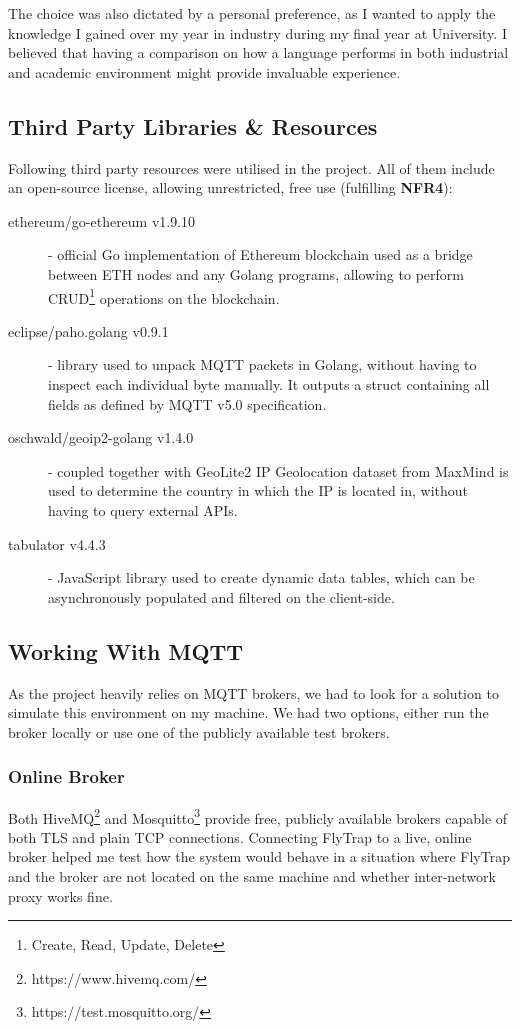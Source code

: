 The choice was also dictated by a personal preference, as I wanted to apply the knowledge I gained over my year in industry during my final year at University. I believed that having a comparison on how a language performs in both industrial and academic environment might provide invaluable experience.
\subsection{Third Party Libraries \& Resources}\label{sec:tpp}
Following third party resources were utilised in the project. All of them include an open-source license, allowing unrestricted, free use (fulfilling \textbf{NFR4}):
\begin{description}
  \item[ethereum/go-ethereum v1.9.10] \cite{ethereum2017official} - official Go implementation of Ethereum blockchain used as a bridge between ETH nodes and any Golang programs, allowing to perform CRUD\footnote{Create, Read, Update, Delete} operations on the blockchain.
    \item[eclipse/paho.golang v0.9.1] \cite{pahogolang} - library used to unpack MQTT packets in Golang, without having to inspect each individual byte manually. It outputs a struct containing all fields as defined by MQTT v5.0 specification.
    \item[oschwald/geoip2-golang v1.4.0] \cite{geoip2} - coupled together with GeoLite2 IP Geolocation dataset from MaxMind \cite{maxmind} is used to determine the country in which the IP is located in, without having to query external APIs. 
    \item[tabulator v4.4.3] \cite{tabulator} - JavaScript library used to create dynamic data tables, which can be asynchronously populated and filtered on the client-side.
\end{description}

\subsection{Working With MQTT}
As the project heavily relies on MQTT brokers, we had to look for a solution to simulate this environment on my machine. We had two options, either run the broker locally or use one of the publicly available test brokers.
\subsubsection{Online Broker}
Both HiveMQ\footnote{https://www.hivemq.com/} and Mosquitto\footnote{https://test.mosquitto.org/} provide free, publicly available brokers capable of both TLS and plain TCP connections. Connecting FlyTrap to a live, online broker helped me test how the system would behave in a situation where FlyTrap and the broker are not located on the same machine and whether inter-network proxy works fine.
